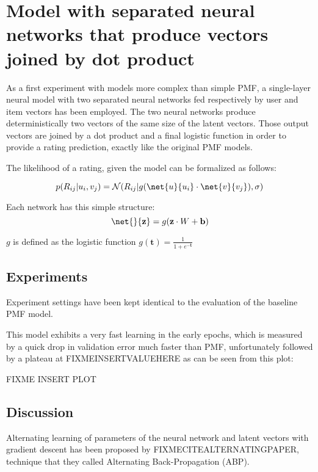\section{Model with separated neural networks that produce vectors joined by dot product}

As a first experiment with models more complex than simple PMF, a single-layer neural model with two separated 
neural networks fed respectively by user and item vectors has been employed.
The two neural networks produce deterministically two vectors of the same size of the latent vectors. Those output vectors are joined by a dot product and a final logistic function in order to provide a rating prediction, exactly like the original PMF models.

The likelihood of a rating, given the model can be formalized as follows:

\begin{equation}
p(R_{ij}|u_i,v_j) = \mathcal{N}(R_{ij}|g(\net{u}{u_i}\cdot\net{v}{v_j}),\sigma)
\end{equation}

Each network has this simple structure:
\begin{equation}
\net{}{\mathbf{z}} = g(\mathbf{z} \cdot W + \mathbf{b})
\end{equation}

$g$ is defined as the logistic function $g(\mathbf{t}) = \frac{1}{1 + e^{-\mathbf{t}}}$

\subsection{Experiments}

Experiment settings have been kept identical to the evaluation of the baseline PMF model.

This model exhibits a very fast learning in the early epochs, which is measured by a quick drop in validation error much faster than PMF, unfortunately followed by a plateau at FIXMEINSERTVALUEHERE as can be seen from this plot:

    FIXME INSERT PLOT

\subsection{Discussion}

Alternating learning of parameters of the neural network and latent vectors
with gradient descent has been proposed by FIXMECITEALTERNATINGPAPER,
technique that they called Alternating Back-Propagation (ABP).

